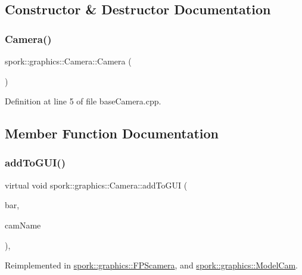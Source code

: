 \subsection{Constructor \& Destructor Documentation}
\mbox{\label{classspork_1_1graphics_1_1_camera_a24c84a147cee9c82b55ef887bc514755}} 
\subsubsection{\texorpdfstring{Camera()}{Camera()}}
{\footnotesize\ttfamily spork\+::graphics\+::\+Camera\+::\+Camera (\begin{DoxyParamCaption}{ }\end{DoxyParamCaption})}



Definition at line 5 of file base\+Camera.\+cpp.



\subsection{Member Function Documentation}
\mbox{\label{classspork_1_1graphics_1_1_camera_a5ec54ffdedf82db7e3790566bd1e3522}} 
\subsubsection{\texorpdfstring{add\+To\+G\+U\+I()}{addToGUI()}}
{\footnotesize\ttfamily virtual void spork\+::graphics\+::\+Camera\+::add\+To\+G\+UI (\begin{DoxyParamCaption}\item[{Tw\+Bar $\ast$}]{bar,  }\item[{const char $\ast$}]{cam\+Name }\end{DoxyParamCaption})\hspace{0.3cm}{\ttfamily [inline]}, {\ttfamily [virtual]}}



Reimplemented in \hyperlink{classspork_1_1graphics_1_1_f_p_scamera_a8bf998a5b4adaab430a283ce6f6cd124}{spork\+::graphics\+::\+F\+P\+Scamera}, and \hyperlink{classspork_1_1graphics_1_1_model_cam_ade4df0e81cc325af221081634384783d}{spork\+::graphics\+::\+Model\+Cam}.



